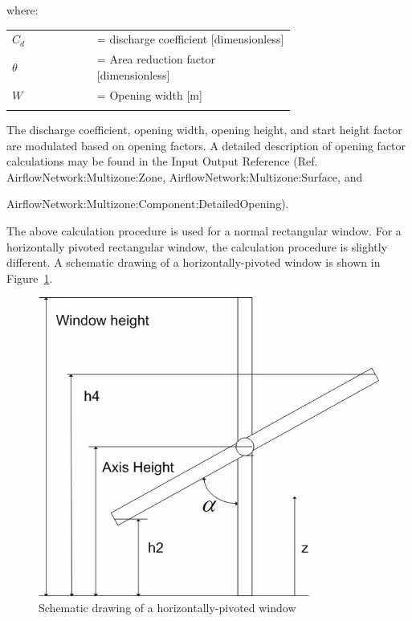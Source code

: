 where:

\begin{tabular}{lp{0.7\linewidth}}
\\
$C_d$ &= discharge coefficient [dimensionless]\\
$\theta$ &= Area reduction factor [dimensionless]\\
$W$ &= Opening width [m]\\
\\
\end{tabular}

The discharge coefficient, opening width, opening height, and start height factor are modulated based on opening factors. A detailed description of opening factor calculations may be found in the Input Output Reference (Ref. AirflowNetwork:Multizone:Zone, AirflowNetwork:Multizone:Surface, and

AirflowNetwork:Multizone:Component:DetailedOpening).

The above calculation procedure is used for a normal rectangular window. For a horizontally pivoted rectangular window, the calculation procedure is slightly different. A schematic drawing of a horizontally-pivoted window is shown in Figure~\ref{fig:schematic-drawing-of-a-horizontally-pivoted}.

\begin{figure}[hbtp] %
\centering
\includegraphics[width=0.9\linewidth, height=0.9\textheight, keepaspectratio=true]{media/image2703.png}
\caption{Schematic drawing of a horizontally-pivoted window \protect \label{fig:schematic-drawing-of-a-horizontally-pivoted}}
\end{figure}

